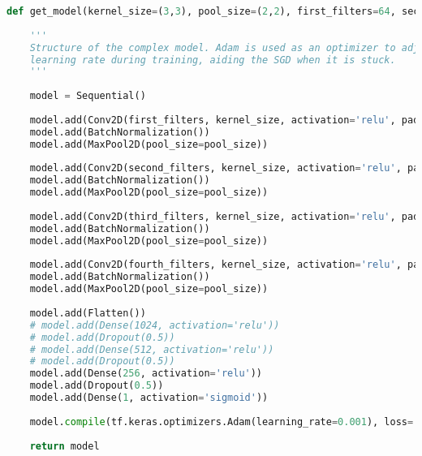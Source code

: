 \begin{lstlisting}[language=Python, caption=Model 3]
def get_model(kernel_size=(3,3), pool_size=(2,2), first_filters=64, second_filters=128, third_filters=256, fourth_filters=1024):
    
    '''
    Structure of the complex model. Adam is used as an optimizer to adjust the 
    learning rate during training, aiding the SGD when it is stuck.
    ''' 
    
    model = Sequential()    
    
    model.add(Conv2D(first_filters, kernel_size, activation='relu', padding='same', input_shape=(IMAGE_SIZE, IMAGE_SIZE, 3)))
    model.add(BatchNormalization())
    model.add(MaxPool2D(pool_size=pool_size))
    
    model.add(Conv2D(second_filters, kernel_size, activation='relu', padding='same'))
    model.add(BatchNormalization())
    model.add(MaxPool2D(pool_size=pool_size))
    
    model.add(Conv2D(third_filters, kernel_size, activation='relu', padding='same'))
    model.add(BatchNormalization())
    model.add(MaxPool2D(pool_size=pool_size))
    
    model.add(Conv2D(fourth_filters, kernel_size, activation='relu', padding='same'))
    model.add(BatchNormalization())
    model.add(MaxPool2D(pool_size=pool_size))
    
    model.add(Flatten())
    # model.add(Dense(1024, activation='relu'))
    # model.add(Dropout(0.5))
    # model.add(Dense(512, activation='relu'))
    # model.add(Dropout(0.5))
    model.add(Dense(256, activation='relu'))
    model.add(Dropout(0.5))
    model.add(Dense(1, activation='sigmoid'))
    
    model.compile(tf.keras.optimizers.Adam(learning_rate=0.001), loss='binary_crossentropy', metrics=['accuracy'])
    
    return model
\end{lstlisting}